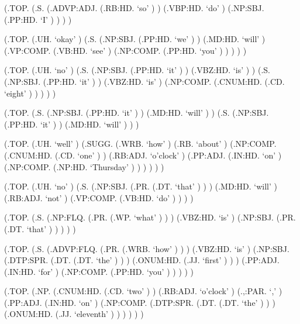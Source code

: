 \documentclass[10pt]{article}
\begin{document}
\begin{parsetree}  (.TOP. (.S. (.ADVP:ADJ. (.RB:HD. `so' ) ) (.VBP:HD. `do' ) (.NP:SBJ. (.PP:HD. `I' ) ) ) ) \end{parsetree}

\begin{parsetree}  (.TOP. (.UH. `okay' ) (.S. (.NP:SBJ. (.PP:HD. `we' ) ) (.MD:HD. `will' ) (.VP:COMP. (.VB:HD. `see' ) (.NP:COMP. (.PP:HD. `you' ) ) ) ) ) \end{parsetree}

\begin{parsetree}  (.TOP. (.UH. `no' ) (.S. (.NP:SBJ. (.PP:HD. `it' ) ) (.VBZ:HD. `is' ) ) (.S. (.NP:SBJ. (.PP:HD. `it' ) ) (.VBZ:HD. `is' ) (.NP:COMP. (.CNUM:HD. (.CD. `eight' ) ) ) ) ) \end{parsetree}

\begin{parsetree}  (.TOP. (.S. (.NP:SBJ. (.PP:HD. `it' ) ) (.MD:HD. `will' ) ) (.S. (.NP:SBJ. (.PP:HD. `it' ) ) (.MD:HD. `will' ) ) ) \end{parsetree}

\begin{parsetree}  (.TOP. (.UH. `well' ) (.SUGG. (.WRB. `how' ) (.RB. `about' ) (.NP:COMP. (.CNUM:HD. (.CD. `one' ) ) (.RB:ADJ. `o'clock' ) (.PP:ADJ. (.IN:HD. `on' ) (.NP:COMP. (.NP:HD. `Thursday' ) ) ) ) ) ) \end{parsetree}

\begin{parsetree}  (.TOP. (.UH. `no' ) (.S. (.NP:SBJ. (.PR. (.DT. `that' ) ) ) (.MD:HD. `will' ) (.RB:ADJ. `not' ) (.VP:COMP. (.VB:HD. `do' ) ) ) ) \end{parsetree}

\begin{parsetree}  (.TOP. (.S. (.NP:FLQ. (.PR. (.WP. `what' ) ) ) (.VBZ:HD. `is' ) (.NP:SBJ. (.PR. (.DT. `that' ) ) ) ) ) \end{parsetree}

\begin{parsetree}  (.TOP. (.S. (.ADVP:FLQ. (.PR. (.WRB. `how' ) ) ) (.VBZ:HD. `is' ) (.NP:SBJ. (.DTP:SPR. (.DT. (.DT. `the' ) ) ) (.ONUM:HD. (.JJ. `first' ) ) ) (.PP:ADJ. (.IN:HD. `for' ) (.NP:COMP. (.PP:HD. `you' ) ) ) ) ) \end{parsetree}

\begin{parsetree}  (.TOP. (.NP. (.CNUM:HD. (.CD. `two' ) ) (.RB:ADJ. `o'clock' ) (.,:PAR. `,' ) (.PP:ADJ. (.IN:HD. `on' ) (.NP:COMP. (.DTP:SPR. (.DT. (.DT. `the' ) ) ) (.ONUM:HD. (.JJ. `eleventh' ) ) ) ) ) ) \end{parsetree}
\end{document}
